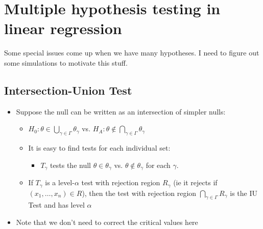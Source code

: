 

\chapter{Multiple hypothesis testing in linear regression}

Some special issues come up when we have many hypotheses.  I need to
figure out some simulations to motivate this stuff.

\section{Intersection-Union Test}

\begin{itemize}[leftmargin=0pt]
\item Suppose the null can be written as an intersection of simpler
  nulls:
  \begin{itemize}
  \item $H_0: \theta \in \bigcup_{\gamma \in \Gamma} \theta_\gamma$ vs.  $H_A: \theta \notin \bigcap_{\gamma \in \Gamma} \theta_\gamma$
  \item It is easy to find tests for each individual set:
    \begin{itemize}
    \item $T_\gamma$ tests the null $\theta \in \theta_\gamma$ vs. $\theta \notin \theta_\gamma$ for each $\gamma$.
    \end{itemize}
  \item If $T_\gamma$ is a level-$\alpha$ test with rejection region $R_\gamma$ (ie
    it rejects if $(x_1,\dots,x_n) \in R$), then the test with rejection
    region $\bigcap_{\gamma \in \Gamma} R_\gamma$ is the IU Test and has level $\alpha$
  \end{itemize}
\item Note that we don't need to correct the critical values here
\end{itemize}

